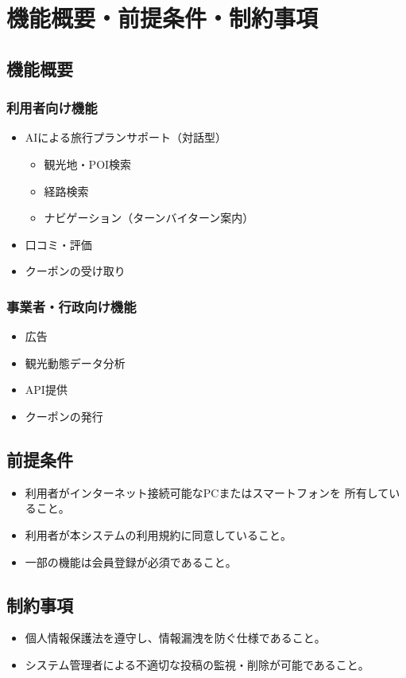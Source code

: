 \documentclass{docs}
\begin{document}
\section{機能概要・前提条件・制約事項}

\subsection{機能概要}
\subsubsection{利用者向け機能}
\begin{itemize}
	\item AIによる旅行プランサポート（対話型）
\begin{itemize}
	\item 観光地・POI検索
	\item 経路検索
	\item ナビゲーション（ターンバイターン案内）
\end{itemize}
	\item 口コミ・評価
	\item クーポンの受け取り
\end{itemize}

\subsubsection{事業者・行政向け機能}
\begin{itemize}
	\item 広告
	\item 観光動態データ分析
	\item API提供
	\item クーポンの発行
\end{itemize}

\subsection{前提条件}
\begin{itemize}
	\item 利用者がインターネット接続可能なPCまたはスマートフォンを
	所有していること。
	\item 利用者が本システムの利用規約に同意していること。
	\item 一部の機能は会員登録が必須であること。
\end{itemize}

\subsection{制約事項}
\begin{itemize}
	\item 個人情報保護法を遵守し、情報漏洩を防ぐ仕様であること。
	\item システム管理者による不適切な投稿の監視・削除が可能であること。
\end{itemize}
\end{document}
